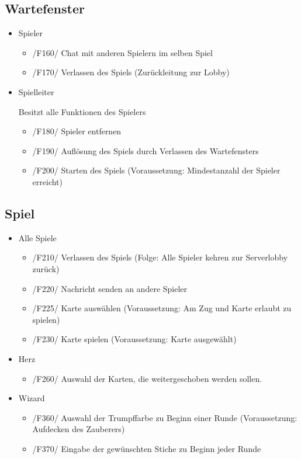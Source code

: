 \documentclass{article}
\begin{document}
\subsection{Wartefenster}
\begin{itemize}
	\item Spieler
	\begin{itemize}
		\item /F160/ Chat mit anderen Spielern im selben Spiel
		\item /F170/ Verlassen des Spiels (Zurückleitung zur Lobby)
	\end{itemize}
	\item Spielleiter
	
	Besitzt alle Funktionen des Spielers
	\begin{itemize}
		\item /F180/ Spieler entfernen
		\item /F190/ Auflösung des Spiels durch Verlassen des Wartefensters
		\item /F200/ Starten des Spiels (Voraussetzung: Mindestanzahl der Spieler erreicht)
	\end{itemize}
\end{itemize}

\subsection{Spiel}
\begin{itemize}
	\item Alle Spiele
	\begin{itemize}
		\item /F210/ Verlassen des Spiels (Folge: Alle Spieler kehren zur Serverlobby zurück)
		\item /F220/ Nachricht senden an andere Spieler
		\item /F225/ Karte auswählen (Voraussetzung: Am Zug und Karte erlaubt zu spielen)
		\item /F230/ Karte spielen (Voraussetzung: Karte ausgewählt)
	\end{itemize}
	\item Herz
	\begin{itemize}
		\item /F260/ Auswahl der Karten, die weitergeschoben werden sollen.
	\end{itemize}
	\item Wizard
	\begin{itemize}
		\item /F360/ Auswahl der Trumpffarbe zu Beginn einer Runde (Voraussetzung: Aufdecken des Zauberers)
		\item /F370/ Eingabe der gewünschten Stiche zu Beginn jeder Runde
	\end{itemize}
\end{itemize}
\end{document}
